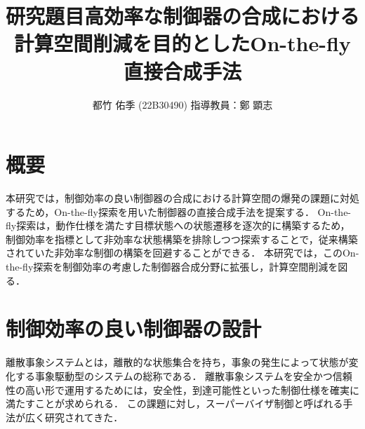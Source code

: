 \documentclass[11pt]{jarticle}
\begin{document}

\title{研究題目}
\title{高効率な制御器の合成における\\計算空間削減を目的としたOn-the-fly直接合成手法}
\author{都竹 佑季 (22B30490) \;\; 指導教員：鄭 顕志}
\date{\empty} %
\maketitle %
\thispagestyle{fancy}


\section{概要} %
本研究では，制御効率の良い制御器の合成における計算空間の爆発の課題に対処するため，On-the-fly探索を用いた制御器の直接合成手法を提案する．
On-the-fly探索は，動作仕様を満たす目標状態への状態遷移を逐次的に構築するため，制御効率を指標として非効率な状態構築を排除しつつ探索することで，従来構築されていた非効率な制御の構築を回避することができる．
本研究では，このOn-the-fly探索を制御効率の考慮した制御器合成分野に拡張し，計算空間削減を図る．

\section{制御効率の良い制御器の設計}

離散事象システムとは，離散的な状態集合を持ち，事象の発生によって状態が変化する事象駆動型のシステムの総称である．
離散事象システムを安全かつ信頼性の高い形で運用するためには，安全性，到達可能性といった制御仕様を確実に満たすことが求められる．
この課題に対し，スーパーバイザ制御と呼ばれる手法が広く研究されてきた．
\end{document}
